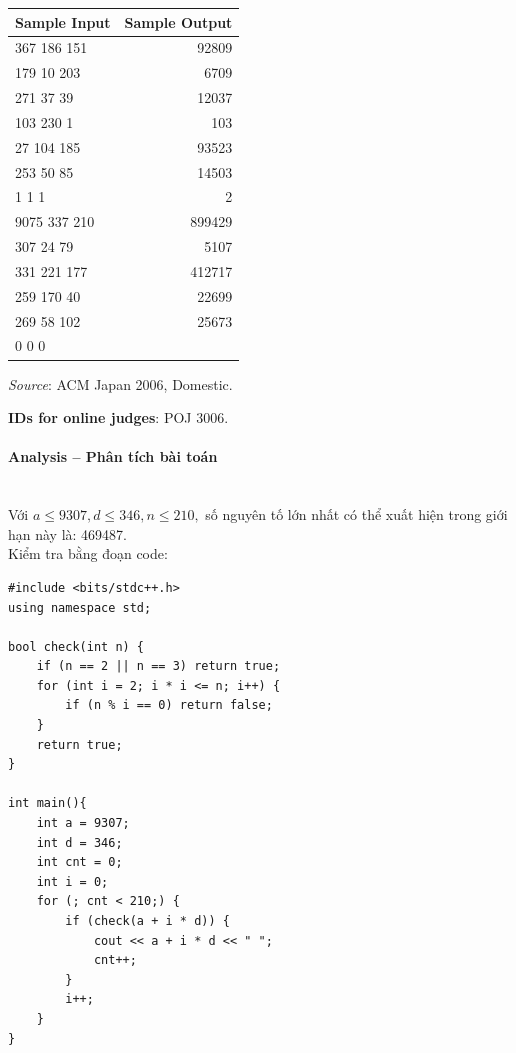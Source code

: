 \documentclass{article}
\begin{document}
\begin{table}[h]
    \centering
    \begin{tabular}{|l|r|}
        \hline
        \textbf{Sample Input} & \textbf{Sample Output} \\
        \hline
        367 186 151 & 92809 \\
        179 10 203 & 6709 \\
        271 37 39 & 12037 \\
        103 230 1 & 103 \\
        27 104 185 & 93523 \\
        253 50 85 & 14503 \\
        1 1 1 & 2 \\
        9075 337 210 & 899429 \\
        307 24 79 & 5107 \\
        331 221 177 & 412717 \\
        259 170 40 & 22699 \\
        269 58 102 & 25673 \\
        0 0 0 & \\ 
        \hline
    \end{tabular}
\end{table}

\textit{Source}: ACM Japan 2006, Domestic.

\textbf{IDs for online judges}: POJ 3006.


\paragraph{Analysis -- Phân tích bài toán} \mbox{} \\

Với $a \leq 9307, d \leq 346, n \leq 210,$ số nguyên tố lớn nhất có thể xuất hiện trong giới hạn này là: 469487. \\

Kiểm tra bằng đoạn code:\\

\begin{lstlisting}
#include <bits/stdc++.h>
using namespace std;
	
bool check(int n) {
	if (n == 2 || n == 3) return true;
	for (int i = 2; i * i <= n; i++) {
		if (n % i == 0) return false;
	}
	return true;
}

int main(){
	int a = 9307;
	int d = 346;
	int cnt = 0;
	int i = 0;
	for (; cnt < 210;) {
		if (check(a + i * d)) {
			cout << a + i * d << " ";
			cnt++;
		}
		i++;
	}
}
\end{lstlisting}
\end{document}
